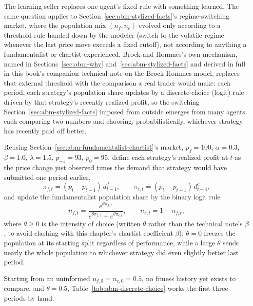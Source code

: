 \documentclass[../ai_in_finance]{subfiles}
\begin{document}
The learning seller replaces one agent's fixed rule with something learned. The same question applies to Section~\ref{sec:abm-stylized-facts}'s regime-switching market, where the population mix $(n_f,n_c)$ evolved only according to a threshold rule handed down by the modeler (switch to the volatile regime whenever the last price move exceeds a fixed cutoff), not according to anything a fundamentalist or chartist experienced. Brock and Hommes's own mechanism, named in Sections~\ref{sec:abm-why} and~\ref{sec:abm-stylized-facts} and derived in full in this book's companion technical note on the Brock-Hommes model, replaces that external threshold with the comparison a real trader would make: each period, each strategy's population share updates by a discrete-choice (logit) rule driven by that strategy's recently realized profit, so the switching Section~\ref{sec:abm-stylized-facts} imposed from outside emerges from many agents each comparing two numbers and choosing, probabilistically, whichever strategy has recently paid off better.

Reusing Section~\ref{sec:abm-fundamentalist-chartist}'s market, $p_f=100$, $\alpha=0.3$, $\beta=1.0$, $\lambda=1.5$, $p_{-1}=93$, $p_0=95$, define each strategy's realized profit at $t$ as the price change just observed times the demand that strategy would have submitted one period earlier,
\begin{equation*}
\pi_{f,t} = (p_t-p_{t-1})\,d^f_{t-1}, \qquad \pi_{c,t} = (p_t-p_{t-1})\,d^c_{t-1},
\end{equation*}
and update the fundamentalist population share by the binary logit rule
\begin{equation}
n_{f,t} = \frac{e^{\theta \pi_{f,t}}}{e^{\theta\pi_{f,t}}+e^{\theta\pi_{c,t}}}, \qquad n_{c,t}=1-n_{f,t},
\label{eq:abm-logit-switching}
\end{equation}
where $\theta\ge0$ is the intensity of choice (written $\theta$ rather than the technical note's $\beta$, to avoid clashing with this chapter's chartist coefficient $\beta$): $\theta=0$ freezes the population at its starting split regardless of performance, while a large $\theta$ sends nearly the whole population to whichever strategy did even slightly better last period.

Starting from an uninformed $n_{f,0}=n_{c,0}=0.5$, no fitness history yet exists to compare, and $\theta=0.5$, Table~\ref{tab:abm-discrete-choice} works the first three periods by hand.
\end{document}
